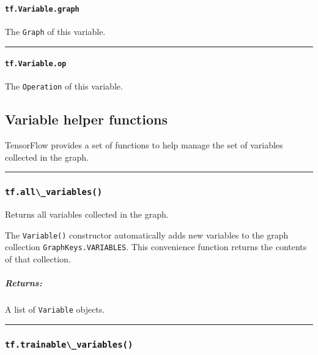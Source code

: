 \paragraph{\texorpdfstring{\lstinline{tf.Variable.graph}
}{tf.Variable.graph }}\label{tf.variable.graph}

The \lstinline{Graph} of this variable.

\begin{center}\rule{0.5\linewidth}{\linethickness}\end{center}

\paragraph{\texorpdfstring{\lstinline{tf.Variable.op}
}{tf.Variable.op }}\label{tf.variable.op}

The \lstinline{Operation} of this variable.

\subsection{Variable helper functions }\label{variable-helper-functions}

TensorFlow provides a set of functions to help manage the set of
variables collected in the graph.

\begin{center}\rule{0.5\linewidth}{\linethickness}\end{center}

\subsubsection{\texorpdfstring{\lstinline{tf.all\_variables()}
}{tf.all\_variables() }}\label{tf.allux5fvariables}

Returns all variables collected in the graph.

The \lstinline{Variable()} constructor automatically adds new variables to
the graph collection \lstinline{GraphKeys.VARIABLES}. This convenience
function returns the contents of that collection.

\subparagraph{Returns: }\label{returns-9}

A list of \lstinline{Variable} objects.

\begin{center}\rule{0.5\linewidth}{\linethickness}\end{center}

\subsubsection{\texorpdfstring{\lstinline{tf.trainable\_variables()}
}{tf.trainable\_variables() }}\label{tf.trainableux5fvariables}

